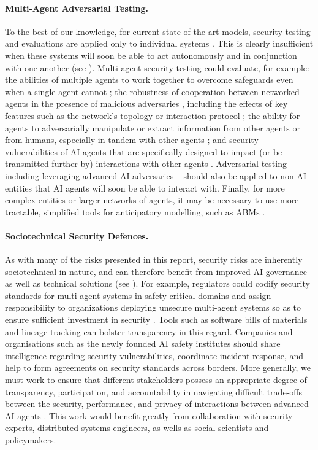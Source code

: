 \paragraph{Multi-Agent Adversarial Testing.}
To the best of our knowledge, for current state-of-the-art models, security testing and evaluations are applied only to individual systems \citep{Shevlane2023}.
This is clearly insufficient when these systems will soon be able to act autonomously and in conjunction with one another (see ).
Multi-agent security testing could evaluate, for example:
the abilities of multiple agents to work together to overcome safeguards even when a single agent cannot \citep{Jones2024};
the robustness of cooperation between networked agents in the presence of malicious adversaries \citep{Barbi2025}, including the effects of key features such as the network's topology or interaction protocol \citep{Huang2024,Marro2024,Hammond2025};
the ability for agents to adversarially manipulate or extract information from other agents or from humans, especially in tandem with other agents \citep{wu_inference_2024,wei_trustworthy_2024}; and
security vulnerabilities of AI agents that are specifically designed to impact (or be transmitted further by) interactions with other agents \citep{Gu2024,Lee2024,Ju2024}.
Adversarial testing -- including leveraging advanced AI adversaries \citep{Perez2022,pavlova2024automatedredteaminggoat} -- should also be applied to non-AI entities that AI agents will soon be able to interact with.
Finally, for more complex entities or larger networks of agents, it may be necessary to use more tractable, simplified tools for anticipatory modelling, such as ABMs \citep{vestad_survey_2024}.

\paragraph{Sociotechnical Security Defences.}
As with many of the risks presented in this report, security risks are inherently sociotechnical in nature, and can therefore benefit from improved AI governance as well as technical solutions (see ).
For example, regulators could codify security standards for multi-agent systems in safety-critical domains and assign responsibility to organizations deploying unsecure multi-agent systems so as to ensure sufficient investment in security \citep{khlaaf2023}.
Tools such as software bills of materials \citep{sbom} and lineage tracking \citep{lineagetracking} can bolster transparency in this regard.
Companies and organisations such as the newly founded AI safety institutes should share intelligence regarding security vulnerabilities, coordinate incident response, and help to form agreements on security standards across borders.
More generally, we must work to ensure that different stakeholders possess an appropriate degree of transparency, participation, and accountability in navigating difficult trade-offs between the security, performance, and privacy of interactions between advanced AI agents \citep{sangwan_cybersecurity_2023,Gabriel2024}.
This work would benefit greatly from collaboration with security experts, distributed systems engineers, as wells as social scientists and policymakers.

